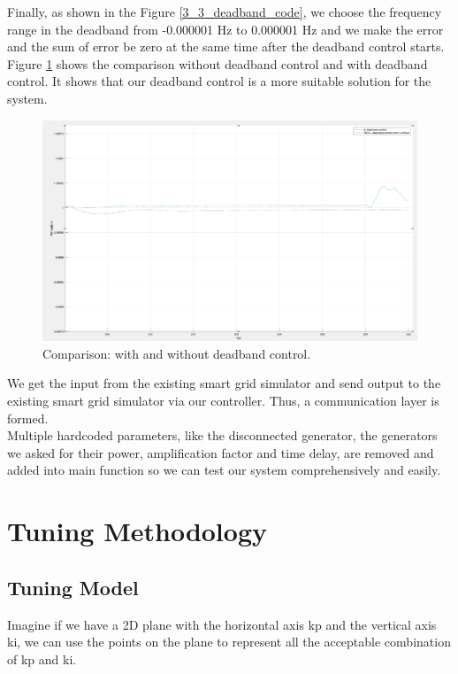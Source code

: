 \documentclass{report}
\begin{document}
Finally, as shown in the Figure \textcolor{red}{\ref{3_3_deadband_code}}, we choose the frequency range in the deadband from -0.000001 Hz to 0.000001 Hz and we make the error and the sum of error be zero at the same time after the deadband control starts. Figure \textcolor{red}{\ref{3_3_deadband_result}} shows the comparison without deadband control and with deadband control. It shows that our deadband control is a more suitable solution for the system.\\

\begin{figure}[htbp]
\centering
\includegraphics[width = .999\textwidth]{figure/3_3_deadband_result.png}
\caption{Comparison: with and without deadband control.}
\label{3_3_deadband_result}
\end{figure}



We get the input from the existing smart grid simulator and send output to the existing smart grid simulator via our controller. Thus, a communication layer is formed.\\

Multiple hardcoded parameters, like the disconnected generator, the generators we asked for their power, amplification factor and time delay, are removed and added into main function so we can test our system comprehensively and easily.\\


\section{Tuning Methodology } %
\label{section3.4}
\subsection{Tuning Model} %
Imagine if we have a 2D plane with the horizontal axis kp and the vertical axis ki, we can use the points on the plane to represent all the acceptable combination of kp and ki.\\
\end{document}
